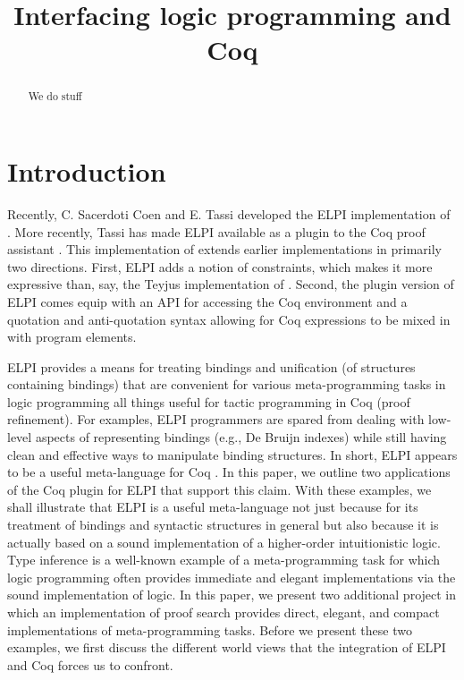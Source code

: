 \documentclass[a4paper,USenglish,cleveref, autoref, thm-restate]{lipics-v2019}
\title{Interfacing logic programming and Coq} %
\begin{document}
\maketitle

\begin{abstract}
We do stuff
\end{abstract}

\section{Introduction}
\label{sec:intro}

Recently, C. Sacerdoti Coen and E. Tassi developed the ELPI
implementation \cite{dunchev15lpar} of \lP \cite{miller12proghol}.
More recently, Tassi has made ELPI available as a plugin to the Coq
proof assistant \cite{tassi18coqpl}.  This implementation of \lP
extends earlier implementations in primarily two directions.  First,
ELPI adds a notion of constraints, which makes it more expressive than,
say, the Teyjus implementation of \lP \cite{nadathur99cade}.  Second,
the plugin version of ELPI comes equip with an API for accessing the
Coq environment and a quotation and anti-quotation syntax allowing for
Coq expressions to be mixed in with \lP program elements.

ELPI provides a means for treating bindings and unification (of
structures containing bindings) that are convenient for various
meta-programming tasks in logic programming all things useful for
tactic programming in Coq (proof refinement).  For examples, ELPI
programmers are spared from dealing with low-level aspects of
representing bindings (e.g., De Bruijn indexes) while still having
clean and effective ways to manipulate binding structures.  In short,
ELPI appears to be a useful meta-language for Coq
\cite{coen19mscs,tassi18coqpl,tassi19itp}.  In this paper, we outline
two applications of the Coq plugin for ELPI that support this claim.
With these examples, we shall illustrate that ELPI is a useful
meta-language not just because for its treatment of bindings and
syntactic structures in general but also because it is actually based
on a sound implementation of a higher-order intuitionistic logic.
Type inference is a well-known example of a meta-programming task for
which logic programming often provides immediate and elegant
implementations via the sound implementation of logic.  In this paper,
we present two additional project in which an implementation of proof
search provides direct, elegant, and compact implementations of
meta-programming tasks.  Before we present these two examples, we
first discuss the different world views that the integration of ELPI
and Coq forces us to confront.
\end{document}
